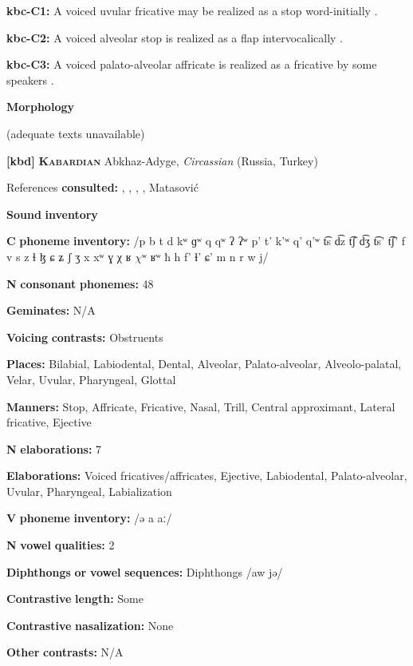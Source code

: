 \begin{styleBody}
\textbf{kbc-C1:} A voiced uvular fricative may be realized as a stop word-initially \citep[16]{Sandalo1997}.

\textbf{kbc-C2:} A voiced alveolar stop is realized as a flap intervocalically \citep[16]{Sandalo1997}.

\textbf{kbc-C3:} A voiced palato-alveolar affricate is realized as a fricative by some speakers \citep[15-16]{Sandalo1997}.

\textbf{Morphology}

(adequate texts unavailable)

\textbf{[kbd]}   \textbf{\textsc{Kabardian}}  Abkhaz-Adyge, \textit{Circassian} (Russia, Turkey)

References \textbf{consulted:} \citet{Applebaum2013}, \citet{Colarusso2006}, \citet{GordonApplebaum2010}, \citet{Kuipers1960}, Matasović 

\textbf{Sound} \textbf{inventory}

\textbf{C} \textbf{phoneme} \textbf{inventory:} /p b t d kʷ ɡʷ q qʷ ʔ ʔʷ p’ t’ k’ʷ q’ q’ʷ t͡s d͡z t͡ʃ d͡ʒ t͡s’ t͡ʃ’ f v s z ɬ ɮ ɕ ʑ ʃ ʒ x xʷ ɣ χ ʁ $\chi ʷ$ ʁʷ ħ h f' ɬ’ ɕ' m n r w j/

\textbf{N} \textbf{consonant} \textbf{phonemes:} 48

\textbf{Geminates:} N/A

\textbf{Voicing} \textbf{contrasts:} Obstruents

\textbf{Places:} Bilabial, Labiodental, Dental, Alveolar, Palato-alveolar, Alveolo-palatal, Velar, Uvular, Pharyngeal, Glottal

\textbf{Manners:} Stop, Affricate, Fricative, Nasal, Trill, Central approximant, Lateral fricative, Ejective

\textbf{N} \textbf{elaborations:} 7

\textbf{Elaborations:} Voiced fricatives/affricates, Ejective, Labiodental, Palato-alveolar, Uvular, Pharyngeal, Labialization

\textbf{V} \textbf{phoneme} \textbf{inventory:} /ə a aː/

\textbf{N} \textbf{vowel} \textbf{qualities:} 2

\textbf{Diphthongs} \textbf{or} \textbf{vowel} \textbf{sequences:} Diphthongs /aw jə/

\textbf{Contrastive} \textbf{length:} Some

\textbf{Contrastive} \textbf{nasalization:} None

\textbf{Other} \textbf{contrasts:} N/A


\end{styleBody}
